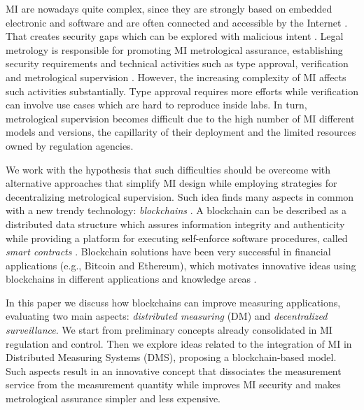 \documentclass[conference]{IEEEtran}
\begin{document}
MI are nowadays quite complex, since they are strongly based on embedded electronic and software and are often connected and accessible by the Internet \cite{Esche2015,Camara2012}. That creates security gaps which can be explored with malicious intent \cite{Boccardo2014,Peters2015}. Legal metrology is responsible for promoting MI metrological assurance, establishing security requirements and technical activities such as type approval, verification and metrological supervision \cite{RodriguesFilho2015}. However, the increasing complexity of MI affects such activities substantially. Type approval requires more efforts while verification can involve use cases which are hard to reproduce inside labs. In turn, metrological supervision becomes difficult due to the high number of MI different models and versions, the capillarity of their deployment and the limited resources owned by regulation agencies.

We work with the hypothesis that such difficulties should be overcome with alternative approaches that simplify MI design while employing strategies for decentralizing metrological supervision. Such idea finds many aspects in common with a new trendy technology: \emph{blockchains} \cite{Zheng2017}. A blockchain can be described as a distributed data structure which assures information integrity and authenticity while providing a platform for executing self-enforce software procedures, called \emph{smart contracts} \cite{Christidis2016}. Blockchain solutions have been very successful in financial applications (e.g., Bitcoin and Ethereum), which motivates innovative ideas using blockchains in different applications and knowledge areas \cite{Zheng2017,Christidis2016}.

In this paper we discuss how blockchains can improve measuring applications, evaluating two main aspects: \emph{distributed measuring} (DM) and \emph{decentralized surveillance}. We start from preliminary concepts already consolidated in MI regulation and control. Then we explore ideas related to the integration of MI in Distributed Measuring Systems (DMS), proposing a blockchain-based model. Such aspects result in an innovative concept that dissociates the measurement service from the measurement quantity while improves MI security and makes metrological assurance simpler and less expensive. %
\end{document}
